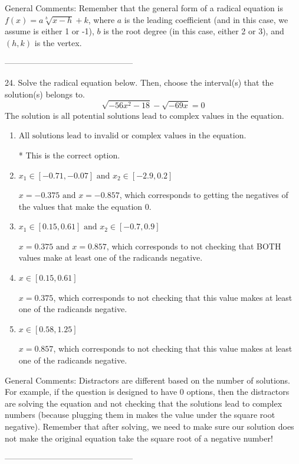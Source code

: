 \documentclass{article}[14pt]
\begin{document}
General Comments: Remember that the general form of a radical equation is $ f(x) = a \sqrt[b]{x - h} + k $, where $a$ is the leading coefficient (and in this case, we assume is either 1 or -1), $b$ is the root degree (in this case, either 2 or 3), and $(h, k)$ is the vertex.

-----------------------------------------------

24. Solve the radical equation below. Then, choose the interval(s) that the solution(s) belongs to.
$$ \sqrt{-56 x^2 - 18} - \sqrt{-69 x} = 0 $$ 
The solution is $ \text{all potential solutions lead to complex values in the equation.} $ 

\begin{enumerate}[label=\Alph*.] 
\item $ \text{All solutions lead to invalid or complex values in the equation.} $ 

 * This is the correct option. 
\item $ x_1 \in [-0.71, -0.07] \text{ and } x_2 \in [-2.9,0.2] $ 

 $x = -0.375 \text{ and } x = -0.857$, which corresponds to getting the negatives of the values that make the equation 0. 
\item $ x_1 \in [0.15, 0.61] \text{ and } x_2 \in [-0.7,0.9] $ 

 $x = 0.375 \text{ and } x = 0.857$, which corresponds to not checking that BOTH values make at least one of the radicands negative. 
\item $ x \in [0.15,0.61] $ 

 $x = 0.375$, which corresponds to not checking that this value makes at least one of the radicands negative. 
\item $ x \in [0.58,1.25] $ 

 $x = 0.857$, which corresponds to not checking that this value makes at least one of the radicands negative. 
\end{enumerate} 
 
General Comments: Distractors are different based on the number of solutions. For example, if the question is designed to have 0 options, then the distractors are solving the equation and not checking that the solutions lead to complex numbers (because plugging them in makes the value under the square root negative). Remember that after solving, we need to make sure our solution does not make the original equation take the square root of a negative number!

-----------------------------------------------
\end{document}
